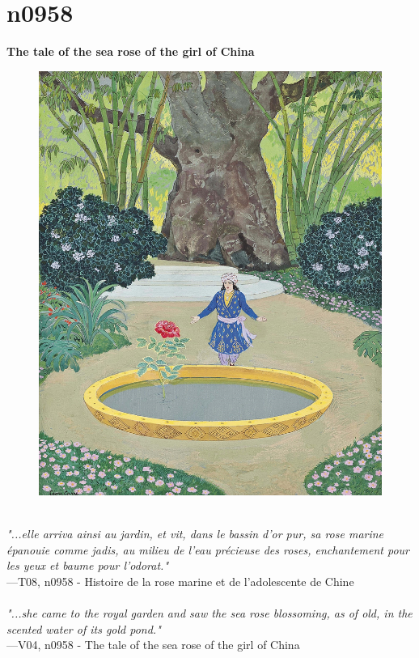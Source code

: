 \documentclass[../Carre_nights.tex]{subfiles}
\begin{document}
\newpage

\section{n0958}
\textbf{\Large{The tale of the sea rose of the girl of China}} \\

\begin{figure}[ht]
\centering
\includegraphics[height=\figsize]{illustrations/volume_8/T08, n0958 - Histoire de la rose marine et de l'adolescente de Chine.jpg}
\end{figure}

\textit{\\
"...elle arriva ainsi au jardin, et vit, dans le bassin d’or pur, sa rose marine épanouie comme jadis, au milieu de l’eau précieuse des roses, enchantement pour les yeux et baume pour l’odorat."} \\
—T08, n0958 - Histoire de la rose marine et de l'adolescente de Chine \\~\\
\textit{"...she came to the royal garden and saw the sea rose blossoming, as of old, in the scented water of its gold pond."} \\
—V04, n0958 - The tale of the sea rose of the girl of China
\end{document}
